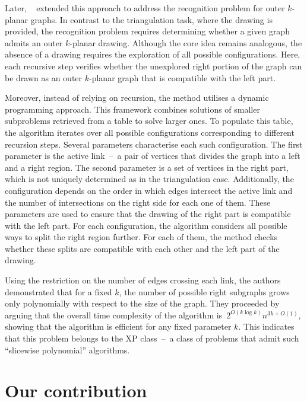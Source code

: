 Later, \citeauthor{okp}~\cite{okp} extended this approach to address the recognition problem for outer \(k\)-planar graphs. In contrast to the triangulation task, where the drawing is provided, the recognition problem requires determining whether a given graph admits an outer \(k\)-planar drawing. Although the core idea remains analogous, the absence of a drawing requires the exploration of all possible configurations. Here, each recursive step verifies whether the unexplored right portion of the graph can be drawn as an outer \(k\)-planar graph that is compatible with the left part.

Moreover, instead of relying on recursion, the method utilises a dynamic programming approach. This framework combines solutions of smaller subproblems retrieved from a table to solve larger ones. To populate this table, the algorithm iterates over all possible configurations corresponding to different recursion steps. Several parameters characterise each such configuration. The first parameter is the active link~--~a pair of vertices that divides the graph into a left and a right region. The second parameter is a set of vertices in the right part, which is not uniquely determined as in the triangulation case. Additionally, the configuration depends on the order in which edges intersect the active link and the number of intersections on the right side for each one of them. These parameters are used to ensure that the drawing of the right part is compatible with the left part. For each configuration, the algorithm considers all possible ways to split the right region further. For each of them, the method checks whether these splits are compatible with each other and the left part of the drawing.

Using the restriction on the number of edges crossing each link, the authors demonstrated that for a fixed \(k\), the number of possible right subgraphs grows only polynomially with respect to the size of the graph. They proceeded by arguing that the overall time complexity of the algorithm is~\(2^{O(k \log k)}n^{3k + O(1)}\), showing that the algorithm is efficient for any fixed parameter \(k\). This indicates that this problem belongs to the XP class~--~a class of problems that admit such ``slicewise polynomial'' algorithms.


\section{Our contribution}

